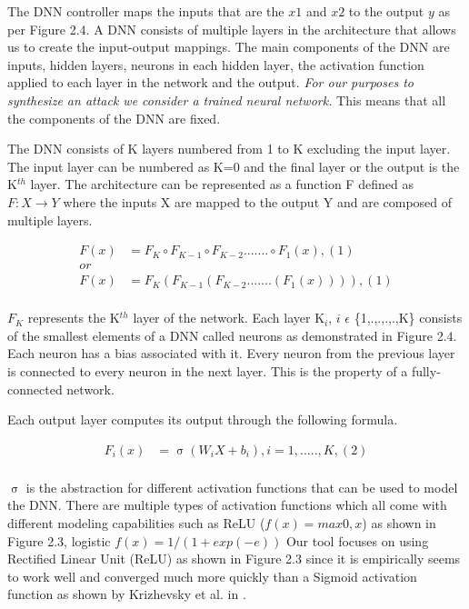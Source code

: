 The DNN controller maps the inputs that are the $x1$ and $x2$ to the output $y$ as per Figure 2.4. A DNN consists of multiple layers in the architecture that allows us to create the input-output mappings. The main components of the DNN are inputs, hidden layers, neurons in each hidden layer, the activation function applied to each layer in the network and the output. \textit{For our purposes to synthesize an attack we consider a trained neural network.} This means that all the components of the DNN are fixed.

The DNN consists of K layers numbered from 1 to K excluding the input layer.  The input layer can be numbered as K=0 and the final layer or the output is the K$^{th}$ layer.
The architecture can be represented as a function F defined as $F: X \rightarrow Y$ where the inputs X are mapped to the output Y and are composed of multiple layers. 

\begin{align*}
F(x) &= F_K \circ F_{K-1} \circ F_{K-2} ....... \circ F_1(x),    (1) \\
or \\
F(x) &= F_K ( F_{K-1}( F_{K-2} .......  (F_1(x)))),    (1) \\
\end{align*} 

$F_K$ represents the K$^{th}$ layer of the network. Each layer K$_{i}$, 
$i$ $\epsilon$ \{1,.,.,.,.,K\} consists of the smallest elements of a DNN called neurons as demonstrated in Figure 2.4.  Each neuron has a bias associated with it. Every neuron from the previous layer is connected to every neuron in the next layer. This is the property of a fully-connected network. 

Each output layer computes its output through the following formula. 

\begin{align*}
F_i(x) &= \upsigma(W_iX + b_i) ,  i = 1,.....,K, (2)  \\
\end{align*}

$\upsigma$ is the abstraction for different activation functions that can be used to model the DNN. There are multiple types of activation functions which all come with different modeling capabilities such as ReLU ($f(x) = max {0,x}$) as shown in Figure 2.3, logistic $f(x)=1/(1+ exp(-e))$
 Our tool focuses on using Rectified Linear Unit (ReLU) as shown in Figure 2.3 since it is empirically seems to work well and converged much more quickly than a Sigmoid  activation function as shown by Krizhevsky et al. in \cite{10.1145/3065386}.  %

